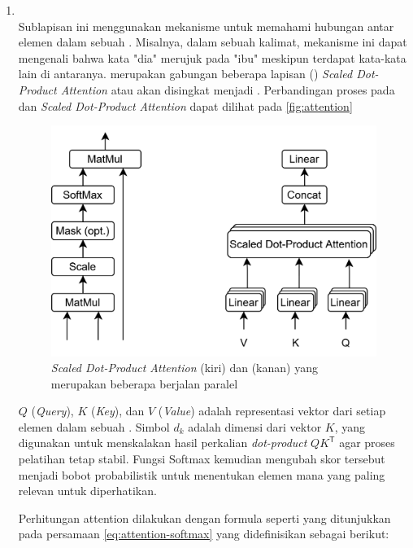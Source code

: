 \begin{enumerate}
\item \mha~\\
Sublapisan ini menggunakan mekanisme \selfattention{} untuk memahami hubungan antar elemen dalam sebuah \sequence{}. Misalnya, dalam sebuah kalimat, mekanisme ini dapat mengenali bahwa kata "dia" 
merujuk pada "ibu" meskipun terdapat kata-kata lain di antaranya. 
\mha{} merupakan gabungan beberapa lapisan (\layer) 
\emph{Scaled Dot-Product Attention} atau akan disingkat menjadi \attention. Perbandingan proses pada \mha{} dan \emph{Scaled Dot-Product Attention} dapat dilihat pada \autoref{fig:attention} 

\begin{figure}[htbp]
\centering
\includegraphics[width=.8\textwidth]{images/attentionmha.png}
	\caption{\emph{Scaled Dot-Product Attention} (kiri) dan \mha{} (kanan) yang merupakan beberapa \layer{} \attention{} berjalan paralel \parencite{vaswani2017attention}}
	\label{fig:attention}
\end{figure}

$Q$ (\emph{Query}), $K$ (\emph{Key}), dan $V$ (\emph{Value}) adalah representasi vektor dari setiap elemen dalam sebuah \sequence. Simbol $d_k$ adalah dimensi dari vektor $K$, yang digunakan untuk menskalakan hasil perkalian \emph{dot-product} $QK^\mathsf{T}$ agar proses pelatihan tetap stabil. Fungsi Softmax kemudian mengubah skor tersebut menjadi bobot probabilistik untuk menentukan elemen mana yang paling relevan untuk diperhatikan.

\pagebreak

Perhitungan attention dilakukan dengan formula seperti yang ditunjukkan pada persamaan \eqref{eq:attention-softmax} \parencite{vaswani2017attention} yang didefinisikan sebagai berikut:


\end{enumerate}
